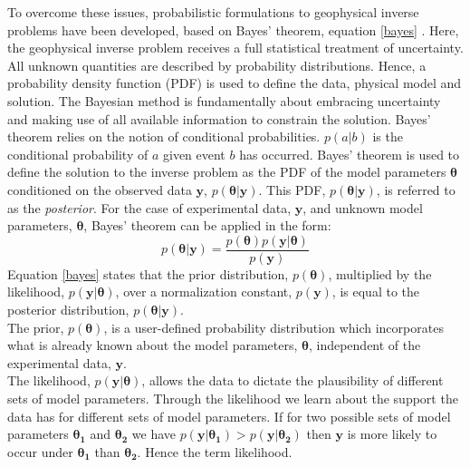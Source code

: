 To overcome these issues, probabilistic formulations to geophysical inverse problems have been developed, based on Bayes' theorem, equation \ref{bayes} \citep{Tarantola1982a,Mosegaard1995,Mosegaard2002,Tarantola2005}. Here, the geophysical inverse problem receives a full statistical treatment of uncertainty. All unknown quantities are described by probability distributions. Hence, a probability density function (PDF) is used to define the data, physical model and solution. The Bayesian method is fundamentally about embracing uncertainty and making use of all available information to constrain the solution. Bayes' theorem relies on the notion of conditional probabilities. $p(a|b)$ is the conditional probability of $a$ given event $b$ has occurred. Bayes' theorem is used to define the solution to the inverse problem as the PDF of the model parameters $\bm{\theta}$ conditioned on the observed data $\bm{y}$, $p(\bm{\theta}|\bm{y})$. This PDF, $p(\bm{\theta}|\bm{y})$, is referred to as the \textit{posterior}. For the case of experimental data, $\bm{y}$, and unknown model parameters, $\bm{\theta}$, Bayes' theorem can be applied in the form:
\begin{equation}
p(\bm{\theta}|\bm{y}) = \frac{p(\bm{\theta}) p(\bm{y}|\bm{\theta})}{p(\bm{y})}
\label{bayes}
\end{equation}
Equation \ref{bayes} states that the prior distribution, $p(\bm{\theta})$, multiplied by the likelihood, $p(\bm{y}|\bm{\theta})$, over a normalization constant, $p(\bm{y})$, is equal to the posterior distribution, $p(\bm{\theta}|\bm{y})$. \\

The prior, $p(\bm{\theta})$, is a user-defined probability distribution which incorporates what is already known about the model parameters, $\bm{\theta}$, independent of the experimental data, $\bm{y}$.\\

The likelihood, $p(\bm{y}|\bm{\theta})$, allows the data to dictate the plausibility of different sets of model parameters. Through the likelihood we learn about the support the data has for different sets of model parameters. If for two possible sets of model parameters $\bm{\theta_1}$ and $\bm{\theta_2}$ we have $p(\bm{y}|\bm{\theta_1}) > p(\bm{y}|\bm{\theta_2})$ then $\bm{y}$ is more likely to occur under $\bm{\theta_1}$ than $\bm{\theta_2}$. Hence the term likelihood.\\

